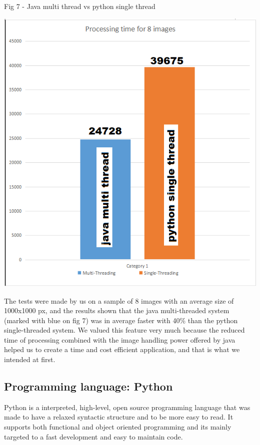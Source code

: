 \documentclass[12pt, a4paper]{report}
\begin{document}
\bigskip

\begin{center}
Fig 7 - Java multi thread vs python single thread
\end{center}
\par 
\includegraphics[scale=0.7, center]{multi_thread2.png}

\quad
The tests were made by us on a sample of 8 images with an average size of 1000x1000 px, and the results shown that the java multi-threaded system (marked with blue on fig 7) was in average faster with 40\% than the python single-threaded system. We valued this feature very much because the reduced time of processing combined with the image handling power offered by java helped us to create a time and cost efficient application, and that is what we intended at first.


\subsection{Programming language: Python}
\medskip

\quad
Python is a interpreted, high-level, open source programming language that was made to have a  relaxed syntactic structure and to be more easy to read. It supports both functional and object oriented programming and its mainly targeted to a fast development and easy to maintain code.
\par
\end{document}
